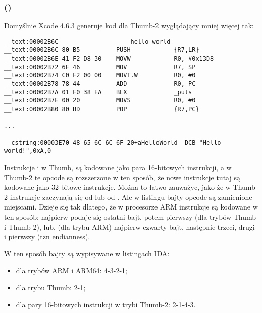 \subsubsection{\OptimizingXcodeIV (\ThumbTwoMode)}

Domyślnie Xcode 4.6.3 generuje kod dla Thumb-2 wyglądający mniej więcej tak:

\begin{lstlisting}[caption=\OptimizingXcodeIV (\ThumbTwoMode),style=customasmARM]
__text:00002B6C                   _hello_world
__text:00002B6C 80 B5          PUSH            {R7,LR}
__text:00002B6E 41 F2 D8 30    MOVW            R0, #0x13D8
__text:00002B72 6F 46          MOV             R7, SP
__text:00002B74 C0 F2 00 00    MOVT.W          R0, #0
__text:00002B78 78 44          ADD             R0, PC
__text:00002B7A 01 F0 38 EA    BLX             _puts
__text:00002B7E 00 20          MOVS            R0, #0
__text:00002B80 80 BD          POP             {R7,PC}

...

__cstring:00003E70 48 65 6C 6C 6F 20+aHelloWorld  DCB "Hello world!",0xA,0
\end{lstlisting}


\myindex{\ThumbTwoMode}
Instrukcje  i  w Thumb, są kodowane jako para 16-bitowych instrukcji, 
a w Thumb-2 te opcode są rozszerzone w ten sposób, że nowe instrukcje tutaj są kodowane jako 32-bitowe instrukcje.
Można to łatwo zauważyc, jako że w Thumb-2 instrukcje zaczynają się od  lub od .
Ale w listingu \IDA bajty opcode są zamienione miejscami.
Dzieje się tak dlatego, że w procesorze ARM instrukcje są kodowane w ten sposób:
najpierw podaje się ostatni bajt, potem pierwszy (dla trybów Thumb i Thumb-2), lub, 
(dla trybu ARM) najpierw czwarty bajt, następnie trzeci, drugi i pierwszy 
(tzn \gls{endianness}).

W ten sposób bajty są wypisywane w listingach IDA:

\begin{itemize}
\item dla trybów ARM i ARM64: 4-3-2-1;
\item dla trybu Thumb: 2-1;
\item dla pary 16-bitowych instrukcji w trybi Thumb-2: 2-1-4-3.
\end{itemize}

